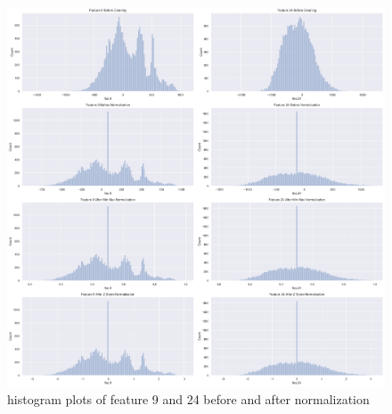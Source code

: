 \begin{figure}[!ht]
 \centering
\includegraphics[width=6.1in]{assignment1/1-3-histograms.png}
\caption{\label{fig:fig1}histogram plots of feature 9 and 24 before and after normalization}
\end{figure}
